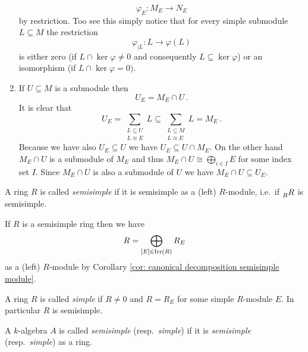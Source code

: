 \begin{rem}
\begin{enumerate}[label=\emph{\alph*)},leftmargin=*]
      \[
                \varphi_E
        \colon  M_E
        \to     N_E
      \]
      by restriction.
      Too see this simply notice that for every simple submodule $L \subseteq M$ the restriction
      \[
                \varphi_{|L}
        \colon  L
        \to     \varphi(L)
      \]
      is either zero (if $L \cap \ker \varphi \neq 0$ and consequently $L \subseteq \ker \varphi$) or an isomorphism (if $L \cap \ker \varphi = 0)$.
    \item
      If $U \subseteq M$ is a submodule then
      \[
          U_E
        = M_E \cap U \,.
      \]
      It is clear that
      \[
                  U_E
        =         \sum_{\substack{L \subseteq U \\ L \cong E}} L
        \subseteq \sum_{\substack{L \subseteq M \\ L \cong E}} L
        =         M_E \,.
      \]
      Because we have also $U_E \subseteq U$ we have $U_E \subseteq U \cap M_E$.
      On the other hand $M_E \cap U$ is a submodule of $M_E$ and thus $M_E \cap U \cong \bigoplus_{i \in I} E$ for some index set $I$.
      Since $M_E \cap U$ is also a submodule of $U$ we have $M_E \cap U \subseteq U_E$.
  \end{enumerate}
\end{rem}


\begin{defi}
  A ring $R$ is called \emph{semisimple} if it is semisimple as a (left) $R$-module, i.e.\ if $\prescript{}{R}{R}$ is semisimple.
\end{defi}


If $R$ is a semisimple ring then we have
\[
    R
  = \bigoplus_{[E] \in \operatorname{Irr}(R)} R_E
\]
as a (left) $R$-module by Corollary \ref{cor: canonical decomposition semisimple module}.


\begin{defi}
  A ring $R$ is called \emph{simple} if $R \neq 0$ and $R = R_E$ for some simple $R$-module $E$.
  In particular $R$ is semisimple.
\end{defi}


\begin{defi}
  A $k$-algebra $A$ is called \emph{semisimple} (resp.\ \emph{simple}) if it is \emph{semisimple} (resp.\ \emph{simple}) as a ring.
\end{defi}



